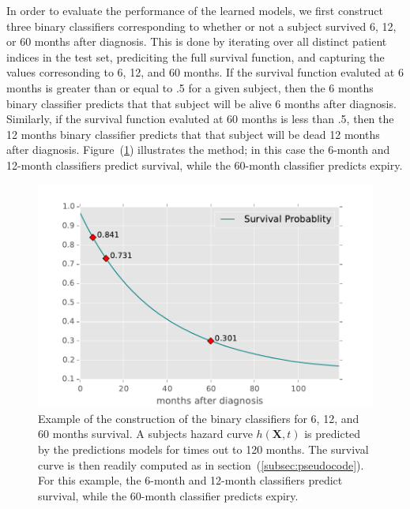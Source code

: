 \documentclass[a4paper,11pt]{article}
\begin{document}
In order to evaluate the performance of the learned models, we first construct three binary classifiers corresponding to whether or not a subject survived 6, 12, or 60 months after diagnosis. 
This is done by iterating over all distinct patient indices in the test set, prediciting the full survival function, and capturing the values corresonding to 6, 12, and 60 months.  
If the survival function evaluted at 6 months is greater than or equal to .5 for a given subject, then the 6 months binary classifier predicts that that subject will be alive 6 months after diagnosis. Similarly, if the survival function evaluted at 60 months is less than .5, then the 12 months binary classifier predicts that that subject will be dead 12 months after diagnosis. Figure~(\ref{fig:survivalexample}) illustrates the method; in this case the 6-month and 12-month classifiers predict survival, while the 60-month classifier predicts expiry.


\begin{figure}[tbp]
\centering 
\begin{center}
\includegraphics[width=.90\textwidth,origin=c]{survivalexample.pdf}
\caption{\label{fig:survivalexample} Example of the construction of the binary classifiers for 6, 12, and 60 months survival.
A subjects hazard curve $h(\mathbf{X}, t)$ is predicted by the predictions models for times out to 120 months. The survival curve is then readily computed as in section~(\ref{subsec:pseudocode}). For this example, the 6-month and 12-month classifiers predict survival, while the 60-month classifier predicts expiry.}
\end{center}
\end{figure}
\end{document}
